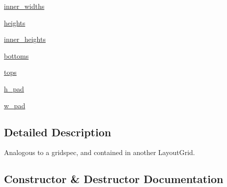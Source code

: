 \begin{DoxyCompactItemize}
\item 
\hyperlink{classmatplotlib_1_1__layoutgrid_1_1LayoutGrid_a6ef3ab76c2e02c75e4e219746e3689eb}{inner\+\_\+widths}
\item 
\hyperlink{classmatplotlib_1_1__layoutgrid_1_1LayoutGrid_a4eae6dbd4e5755cd47c336d772bb6a59}{heights}
\item 
\hyperlink{classmatplotlib_1_1__layoutgrid_1_1LayoutGrid_a553241d211959dbb8e53e18c0b83cb12}{inner\+\_\+heights}
\item 
\hyperlink{classmatplotlib_1_1__layoutgrid_1_1LayoutGrid_aa17a68718d660573b434b351109c8ac0}{bottoms}
\item 
\hyperlink{classmatplotlib_1_1__layoutgrid_1_1LayoutGrid_a38e88276f786188c70f42a92829fe348}{tops}
\item 
\hyperlink{classmatplotlib_1_1__layoutgrid_1_1LayoutGrid_a6c1533b9163fddbef3a1ba344fa6db37}{h\+\_\+pad}
\item 
\hyperlink{classmatplotlib_1_1__layoutgrid_1_1LayoutGrid_a5c622ec6df633468b3d137024802a7fc}{w\+\_\+pad}
\end{DoxyCompactItemize}


\subsection{Detailed Description}
\begin{DoxyVerb}Analogous to a gridspec, and contained in another LayoutGrid.
\end{DoxyVerb}
 

\subsection{Constructor \& Destructor Documentation}
\mbox{\label{classmatplotlib_1_1__layoutgrid_1_1LayoutGrid_a731d39b29ceae5df4bb66abff847e3f1}} 
